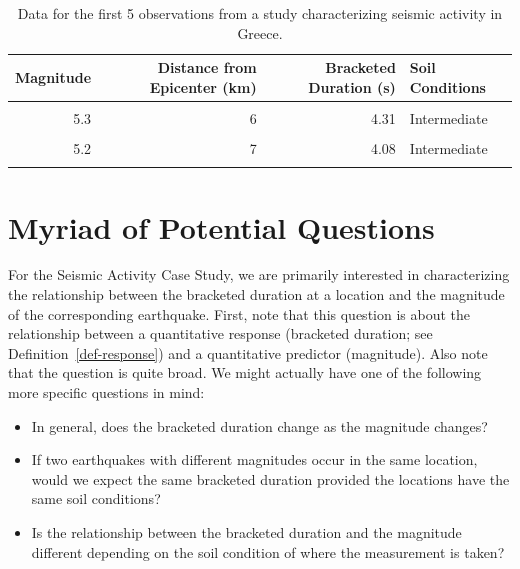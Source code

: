 \documentclass[
  letterpaper,
  DIV=11,
  numbers=noendperiod]{scrreprt}
\providecommand{\tightlist}{%
  \setlength{\itemsep}{0pt}\setlength{\parskip}{0pt}}\usepackage{longtable,booktabs,array}
\theoremstyle{definition}
\theoremstyle{definition}
\theoremstyle{plain}
\theoremstyle{remark}
\begin{document}
\hypertarget{tbl-casegreece-table}{}
\begin{table}
\caption{\label{tbl-casegreece-table}Data for the first 5 observations from a study characterizing seismic
activity in Greece. }\tabularnewline

\centering
\begin{tabular}[t]{rrrl}
\toprule
Magnitude & Distance from Epicenter (km) & Bracketed Duration (s) & Soil Conditions\\
\midrule
\cellcolor{gray!6}{6.4} & \cellcolor{gray!6}{30} & \cellcolor{gray!6}{8.82} & \cellcolor{gray!6}{Soft}\\
5.3 & 6 & 4.31 & Intermediate\\
\cellcolor{gray!6}{5.6} & \cellcolor{gray!6}{15} & \cellcolor{gray!6}{5.74} & \cellcolor{gray!6}{Intermediate}\\
5.2 & 7 & 4.08 & Intermediate\\
\cellcolor{gray!6}{6.6} & \cellcolor{gray!6}{31} & \cellcolor{gray!6}{28.27} & \cellcolor{gray!6}{Soft}\\
\bottomrule
\end{tabular}
\end{table}

\hypertarget{sec-regquestions}{%
\chapter{Myriad of Potential Questions}\label{sec-regquestions}}

For the Seismic Activity Case Study, we are primarily interested in
characterizing the relationship between the bracketed duration at a
location and the magnitude of the corresponding earthquake. First, note
that this question is about the relationship between a quantitative
response (bracketed duration; see Definition~\ref{def-response}) and a
quantitative predictor (magnitude). Also note that the question is quite
broad. We might actually have one of the following more specific
questions in mind:

\begin{itemize}
\tightlist
\item
  In general, does the bracketed duration change as the magnitude
  changes?
\item
  If two earthquakes with different magnitudes occur in the same
  location, would we expect the same bracketed duration provided the
  locations have the same soil conditions?
\item
  Is the relationship between the bracketed duration and the magnitude
  different depending on the soil condition of where the measurement is
  taken?
\end{itemize}
\end{document}
